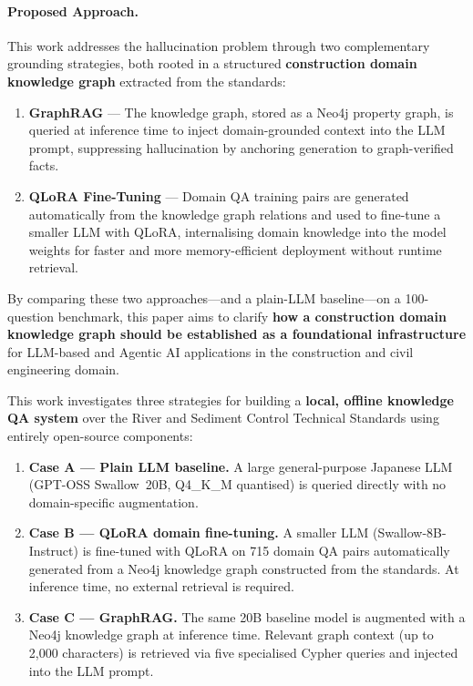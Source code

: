 \documentclass[twocolumn]{article}
\begin{document}
\paragraph{Proposed Approach.}
This work addresses the hallucination problem through two complementary grounding strategies,
both rooted in a structured \textbf{construction domain knowledge graph} extracted from the standards:
\begin{enumerate}
  \item \textbf{GraphRAG} --- The knowledge graph, stored as a Neo4j property graph, is
        queried at inference time to inject domain-grounded context into the LLM prompt,
        suppressing hallucination by anchoring generation to graph-verified facts.
  \item \textbf{QLoRA Fine-Tuning} --- Domain QA training pairs are generated automatically
        from the knowledge graph relations and used to fine-tune a smaller LLM with QLoRA,
        internalising domain knowledge into the model weights for faster and more memory-efficient
        deployment without runtime retrieval.
\end{enumerate}
By comparing these two approaches---and a plain-LLM baseline---on a 100-question benchmark,
this paper aims to clarify \textbf{how a construction domain knowledge graph should be established
as a foundational infrastructure} for LLM-based and Agentic AI applications in the construction
and civil engineering domain.

This work investigates three strategies for building a \textbf{local, offline knowledge QA system}
over the River and Sediment Control Technical Standards using entirely open-source components:

\begin{enumerate}
  \item \textbf{Case A --- Plain LLM baseline.}
        A large general-purpose Japanese LLM (GPT-OSS Swallow~20B, Q4\_K\_M quantised) is
        queried directly with no domain-specific augmentation.

  \item \textbf{Case B --- QLoRA domain fine-tuning.}
        A smaller LLM (Swallow-8B-Instruct) is fine-tuned with QLoRA on 715 domain QA pairs
        automatically generated from a Neo4j knowledge graph constructed from the standards.
        At inference time, no external retrieval is required.

  \item \textbf{Case C --- GraphRAG.}
        The same 20B baseline model is augmented with a Neo4j knowledge graph at inference time.
        Relevant graph context (up to 2,000 characters) is retrieved via five specialised
        Cypher queries and injected into the LLM prompt.
\end{enumerate}
\end{document}
